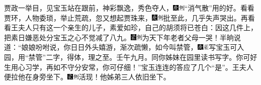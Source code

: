 贾政一举目，见宝玉站在跟前，神彩飘逸，秀色夺人，{\includegraphics[width=3mm]{../Images/00004}\includegraphics[width=3mm]{../Images/00011}\footnotesize \kaishu ``消气散''用的好。}看看贾环，人物委琐，举止荒疏，忽又想起贾珠来，{\includegraphics[width=3mm]{../Images/00004}\includegraphics[width=3mm]{../Images/00011}\footnotesize \kaishu 批至此，几乎失声哭出。}再看看王夫人只有这一个亲生的儿子，素爱如珍，自己的胡须将已苍白：因这几件上，把素日嫌恶处分宝玉之心不觉减了八九。{\includegraphics[width=3mm]{../Images/00006}\includegraphics[width=3mm]{../Images/00011}\footnotesize \kaishu 为天下年老者父母一哭！}半晌说道：``娘娘吩咐说，你日日外头嬉游，渐次疏懒，如今叫禁管，{\includegraphics[width=3mm]{../Images/00004}\includegraphics[width=3mm]{../Images/00010}\footnotesize \kaishu 写宝玉可入园，用``禁管''二字，得体，理之至。壬午九月。}同你姊妹在园里读书写字。你可好生用心习学，再如不守分安常，你可仔细！''宝玉连连的答应了几个``是''。王夫人便拉他在身旁坐下。{\includegraphics[width=3mm]{../Images/00006}\includegraphics[width=3mm]{../Images/00011}\footnotesize \kaishu 活现！}他姊弟三人依旧坐下。

